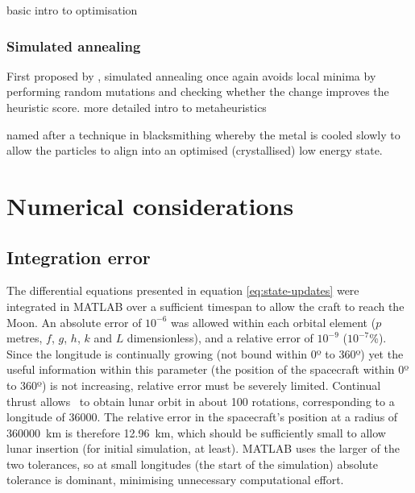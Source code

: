\textcite{Nocedal2006} basic intro to optimisation

\subsubsection{Simulated annealing}

First proposed by \textcite{Kirkpatrick1983}, simulated annealing once again avoids local minima by performing random mutations and checking whether the change improves the heuristic score.
\textcite{Dreo2006} more detailed intro to metaheuristics

named after a technique in blacksmithing whereby the metal is cooled slowly to allow the particles to align into an optimised (crystallised) low energy state.


\section{Numerical considerations} \label{sec:Numerical-considerations}


\subsection{Integration error} \label{sub:Integration-error}

The differential equations presented in equation \eqref{eq:state-updates} were integrated in MATLAB over a sufficient timespan to allow the craft to reach the Moon. An absolute error of $10^{-6}$ was allowed within each orbital element ($p$ metres, $f$, $g$, $h$, $k$ and $L$ dimensionless), and a relative error of $10^{-9}$ ($10^{-7}$\%). Since the longitude is continually growing (not bound within 0º to 360º) yet the useful information within this parameter (the position of the spacecraft within 0º to 360º) is not increasing, relative error must be severely limited. Continual thrust allows \BW\ to obtain lunar orbit in about 100 rotations, corresponding to a longitude of 36000\degrees. The relative error in the spacecraft's position at a radius of 360000~km is therefore 12.96~km, which should be sufficiently small to allow lunar insertion (for initial simulation, at least). MATLAB uses the larger of the two tolerances, so at small longitudes (the start of the simulation) absolute tolerance is dominant, minimising unnecessary computational effort.


